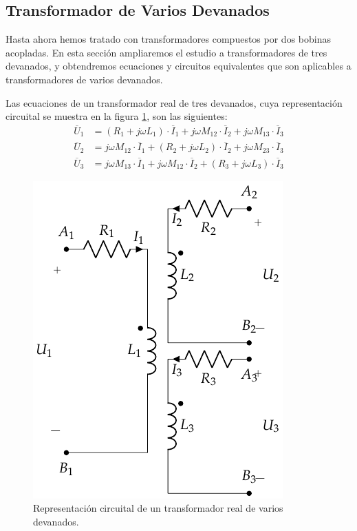   
\subsection{Transformador de Varios Devanados}
\label{sec:trafo-varios-devanados}

Hasta ahora hemos tratado con transformadores compuestos por dos bobinas acopladas. En esta sección ampliaremos el estudio a transformadores de tres devanados, y obtendremos ecuaciones y circuitos equivalentes que son aplicables a transformadores de varios devanados.

Las ecuaciones de un transformador real de tres devanados, cuya representación circuital se muestra en la figura \ref{fig:trafo-varios-devanados}, son las siguientes:
\begin{align*}
  \overline{U}_1 &= (R_1 + j \omega L_1) \cdot \overline{I}_1 + j \omega M_{12} \cdot\overline{I}_2 + j \omega M_{13} \cdot\overline{I}_3\\
  \overline{U}_2 &= j \omega M_{12} \cdot \overline{I}_1 + (R_2 + j \omega L_2) \cdot \overline{I}_2 + j \omega M_{23} \cdot \overline{I}_3\\
  \overline{U}_3 &= j \omega M_{13} \cdot \overline{I}_1 + j \omega M_{12} \cdot\overline{I}_2 + (R_3 + j \omega L_3) \cdot \overline{I}_3
\end{align*}

\begin{figure}
  \centering
  \includegraphics[height=0.25\textheight]{../figs/TrafoVariosDevanados.pdf}
  \caption{Representación circuital de un transformador real de varios devanados.}
  \label{fig:trafo-varios-devanados}
\end{figure}


